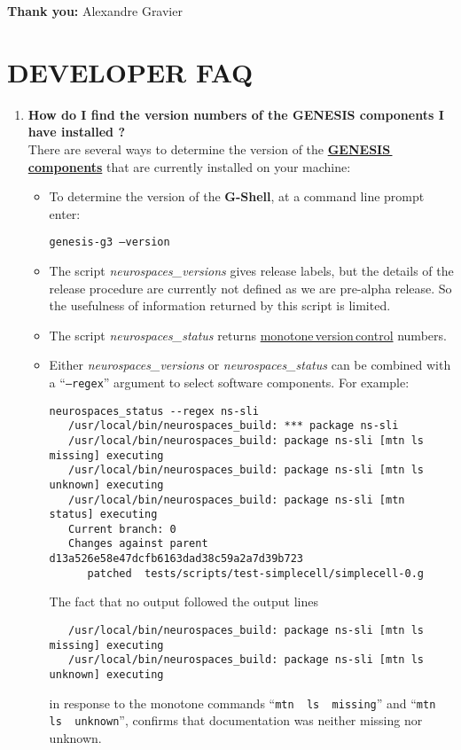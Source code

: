 \documentclass[12pt]{article}
\begin{document}
{\bf Thank you:} Alexandre Gravier

\section*{DEVELOPER FAQ}

\begin{enumerate}

\item {\bf How do I find the version numbers of the GENESIS components I have installed ?} \\
There are several ways to determine the version of the \href{../reserved-words/reserved-words.tex}{\bf GENESIS\,components} that are currently installed on your machine:
\begin{itemize}
\item To determine the version of the {\bf G-Shell}, at a command line prompt enter:

{\tt genesis-g3 --version}

\item The script {\it neurospaces\_versions} gives release labels, but the details
of the release procedure are currently not defined as we are pre-alpha release.  So the usefulness of information returned by this script is limited.

\item The script {\it neurospaces\_status} returns \href{../version-control/version-control.tex}{monotone\,version\,control} numbers.

\item Either {\it neurospaces\_versions} or {\it neurospaces\_status} can be combined with a ``{\tt --regex}'' argument to select
software components.  For example:

\begin{verbatim}
neurospaces_status --regex ns-sli
   /usr/local/bin/neurospaces_build: *** package ns-sli
   /usr/local/bin/neurospaces_build: package ns-sli [mtn ls missing] executing
   /usr/local/bin/neurospaces_build: package ns-sli [mtn ls unknown] executing
   /usr/local/bin/neurospaces_build: package ns-sli [mtn status] executing
   Current branch: 0
   Changes against parent d13a526e58e47dcfb6163dad38c59a2a7d39b723
      patched  tests/scripts/test-simplecell/simplecell-0.g
\end{verbatim}

The fact that no output followed the output lines
\begin{verbatim}
   /usr/local/bin/neurospaces_build: package ns-sli [mtn ls missing] executing
   /usr/local/bin/neurospaces_build: package ns-sli [mtn ls unknown] executing
\end{verbatim}
in response to the monotone commands ``{\tt mtn\,\,ls\,\,missing}'' and ``{\tt mtn\,\,ls\,\,unknown}'', confirms that documentation was neither missing nor unknown.


\end{itemize}
\end{enumerate}
\end{document}

